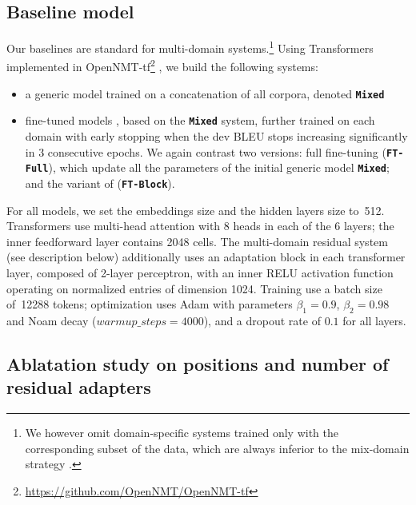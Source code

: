 \documentclass[11pt,a4paper]{article}
\newcommand{\fyDone}[1]{\done[FY]\Todo[FY:]{\textcolor{orange}{#1}}}
\newcommand{\system}[1]{\texttt{\textbf{#1}}}
\begin{document}
\subsection*{Baseline model}
Our baselines are standard for multi-domain systems.\footnote{We however omit domain-specific systems trained only with the corresponding subset of the data, which are always inferior to the mix-domain strategy \cite{Britz17mixing}.} Using Transformers \cite{Vaswani17attention} implemented in OpenNMT-tf\footnote{\url{https://github.com/OpenNMT/OpenNMT-tf}} \cite{Klein17opennmt}, we build the following systems:

\begin{itemize}
\item a generic model trained on a concatenation of all corpora, denoted \system{Mixed}
\item fine-tuned models \cite{Luong15stanford,Freitag16fast}, based on the \system{Mixed} system, further trained on each domain with early stopping when the dev BLEU stops increasing significantly in 3 consecutive epochs. We again contrast two versions: full fine-tuning (\system{FT-Full}), which update all the parameters of the initial generic model \system{Mixed}; and the variant of \cite{Bapna19simple} (\system{FT-Block}).
\end{itemize}

For all models, we set the embeddings size and the hidden layers size to~512. Transformers use multi-head attention with 8 heads in each of the 6 layers; the inner feedforward layer contains 2048 cells. The multi-domain residual system (see description below) additionally uses an adaptation block in each transformer layer, composed of 2-layer perceptron, with an inner RELU activation function operating on normalized entries of dimension 1024. 
Training use a batch size of~12288 tokens; optimization uses Adam with parameters $\beta_1=0.9$, $\beta_2= 0.98$ and Noam decay ($warmup\_steps=4000$), and a dropout rate of $0.1$ for all layers.\fyDone{Describe the block adaptation layer - voir slides}
\subsection{Ablatation study on positions and number of residual adapters}
\end{document}
